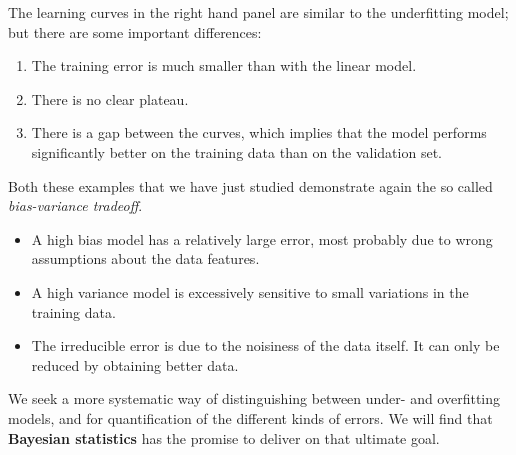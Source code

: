 \documentclass[%
oneside,                 %
final,                   %
10pt]{article}
\begin{document}
\noindent
The learning curves in the right hand panel are similar to the underfitting model; but there are some important differences:

\begin{enumerate}
\item The training error is much smaller than with the linear model.

\item There is no clear plateau.

\item There is a gap between the curves, which implies that the model performs significantly better on the training data than on the validation set.
\end{enumerate}

\noindent
Both these examples that we have just studied demonstrate again the so called \emph{bias-variance tradeoff}.

\begin{itemize}
 \item A high bias model has a relatively large error, most probably due to wrong assumptions about the data features.

 \item A high variance model is excessively sensitive to small variations in the training data.

 \item The irreducible error is due to the noisiness of the data itself. It can only be reduced by obtaining better data.
\end{itemize}

\noindent
We seek a more systematic way of distinguishing between under- and overfitting models, and for quantification of the different kinds of errors. We will find that \textbf{Bayesian statistics} has the promise to deliver on that ultimate goal.



\end{document}
